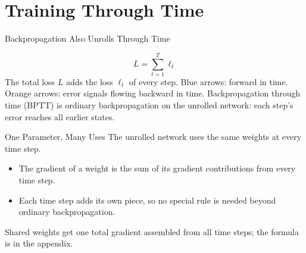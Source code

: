 \documentclass{ntuabeamer}
\begin{document}

\section{Training Through Time}

\begin{frame}{Backpropagation Also Unrolls Through Time}
  \centering
  \vspace{0.3cm}
  \[
    L=\sum_{t=1}^{T}\ell_t
  \]
  The total loss $L$ adds the loss $\ell_t$ of every step. Blue arrows: forward in time. Orange arrows: error signals flowing backward in time.
  Backpropagation through time (BPTT) is ordinary backpropagation on the unrolled network: each step's error reaches all earlier states.
\end{frame}

\begin{frame}{One Parameter, Many Uses}
  The unrolled network uses the same weights at every time step.
  \begin{itemize}
    \item The gradient of a weight is the sum of its gradient contributions from every time step.
    \item Each time step adds its own piece, so no special rule is needed beyond ordinary backpropagation.
  \end{itemize}
  Shared weights get one total gradient assembled from all time steps; the formula is in the appendix.
\end{frame}
\end{document}

